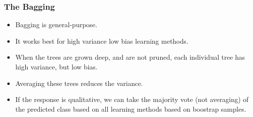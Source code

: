 \documentclass{beamer}
\begin{document}
                   \begin{frame}
                   	\frametitle{The     Bagging  }
                   	\begin{itemize}
                   		\item Bagging is general-purpose.
                   		\item  It works best for high variance low bias learning methods.
				\item  When the trees are grown deep, and are not pruned, each individual tree has high variance, but low bias.
                   		\item  Averaging these trees reduces the variance. 
                   		
                   		\item  If the response is qualitative, we can take the majority vote (not averaging) of the 
                   		predicted class based on all learning methods based on boostrap samples. 
                       		
                   		
                   	\end{itemize}
                   \end{frame} 
               
             
         
\end{document}

